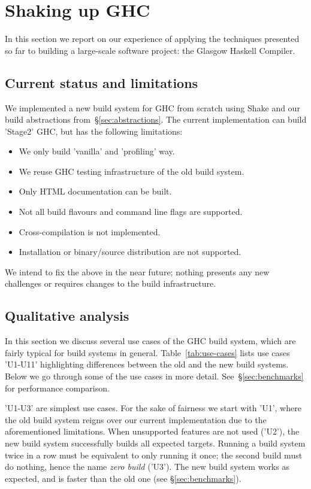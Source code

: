\section{Shaking up GHC\label{sec:ghc}}

In this section we report on our experience of applying the techniques presented
so far to building a large-scale software project: the Glasgow Haskell Compiler.

\subsection{Current status and limitations\label{sec:limitations}}

We implemented a new build system for GHC from scratch using Shake and our build
abstractions from~\S\ref{sec:abstractions}. The current implementation can build
\lst'Stage2' GHC, but has the following limitations:
\begin{itemize}
  \item We only build \lst'vanilla' and \lst'profiling' way.
  \item We reuse GHC testing infrastructure of the old build system.
  \item Only HTML documentation can be built.
  \item Not all build flavours and command line flags are supported.
  \item Cross-compilation is not implemented.
  \item Installation or binary/source distribution are not supported.
\end{itemize}

\noindent We intend to fix the above in the near future; nothing presents any
new challenges or requires changes to the build infrastructure.

\subsection{Qualitative analysis\label{sec:use-cases}}

In this section we discuss several use cases of the GHC build system, which
are fairly typical for build systems in general. Table~\ref{tab:use-cases}
lists use cases \lst'U1-U11' highlighting differences between the old and the
new build systems. Below we go through some of the use cases in more detail.
See~\S\ref{sec:benchmarks} for performance comparison.

\lst'U1-U3' are simplest use cases. For the sake of fairness we start with
\lst'U1', where the old build system reigns over our current implementation due
to the aforementioned limitations. When unsupported features are not used
(\lst'U2'), the new build system successfully builds all expected targets.
Running a build system twice in a row must be equivalent to only running it
once; the second build must do nothing, hence the name \emph{zero
build} (\lst'U3'). The new build system works as expected, and is faster
than the old one (see \S\ref{sec:benchmarks}).

